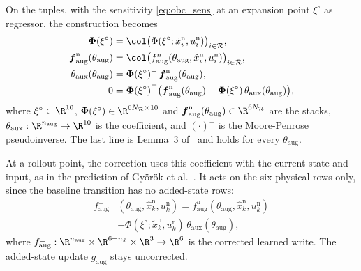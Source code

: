 On the tuples, with the sensitivity \eqref{eq:obc_sens} at an expansion point
$\xi^\circ$ as regressor, the construction becomes
\begin{equation}
\begin{aligned}
 \boldsymbol\Phi(\xi^\circ)&=\col\bigl(\Phi(\xi^\circ;\tilde x^{\mathrm n}_i,
   u^{\mathrm n}_i)\bigr)_{i\in\mathcal R},\\
 \boldsymbol f^{\mathrm n}_{\mathrm{aug}}(\theta_{\mathrm{aug}})
 &=\col\bigl(f^{\mathrm n}_{\mathrm{aug}}(\theta_{\mathrm{aug}},
   \hat x^{\mathrm n}_i,u^{\mathrm n}_i)\bigr)_{i\in\mathcal R},\\
 \theta_{\mathrm{aux}}(\theta_{\mathrm{aug}})
 &=\boldsymbol\Phi(\xi^\circ)^{+}\,
   \boldsymbol f^{\mathrm n}_{\mathrm{aug}}(\theta_{\mathrm{aug}}),\\
 0&=\boldsymbol\Phi(\xi^\circ)^\top\bigl(
   \boldsymbol f^{\mathrm n}_{\mathrm{aug}}(\theta_{\mathrm{aug}})
   -\boldsymbol\Phi(\xi^\circ)\,\theta_{\mathrm{aux}}(\theta_{\mathrm{aug}})\bigr),
\end{aligned}
\label{eq:obc_coef}
\end{equation}
where $\xi^\circ\in\R^{10}$,
$\boldsymbol\Phi(\xi^\circ)\in\R^{6N_{\mathcal R}\times10}$ and
$\boldsymbol f^{\mathrm n}_{\mathrm{aug}}(\theta_{\mathrm{aug}})
\in\R^{6N_{\mathcal R}}$ are the stacks,
$\theta_{\mathrm{aux}}:\R^{n_{\mathrm{aug}}}\to\R^{10}$ is the coefficient,
and $(\cdot)^{+}$ is the Moore-Penrose pseudoinverse.
The last line is Lemma~3 of~\cite{gyorok2026obc} and holds for every
$\theta_{\mathrm{aug}}$.

At a rollout point, the correction uses this coefficient with the current
state and input, as in the prediction of Gy\"or\"ok et
al.~\cite[Eq.~(13)]{gyorok2026obc}.
It acts on the six physical rows only, since the baseline transition has no
added-state rows:
\begin{equation}
\begin{aligned}
 f^{\perp}_{\mathrm{aug}}&(\theta_{\mathrm{aug}},\hat x^{\mathrm n}_k,u^{\mathrm n}_k)
 =f^{\mathrm n}_{\mathrm{aug}}(\theta_{\mathrm{aug}},\hat x^{\mathrm n}_k,u^{\mathrm n}_k)\\
 &-\Phi(\xi^\circ;\tilde x^{\mathrm n}_k,u^{\mathrm n}_k)\,
  \theta_{\mathrm{aux}}(\theta_{\mathrm{aug}}),
\end{aligned}
 \label{eq:obc_corr}
\end{equation}
where $f^{\perp}_{\mathrm{aug}}:\R^{n_{\mathrm{aug}}}\times\R^{6+n_{\bar x}}
\times\R^3\to\R^6$ is the corrected learned write.
The added-state update $g_{\mathrm{aug}}$ stays uncorrected.


